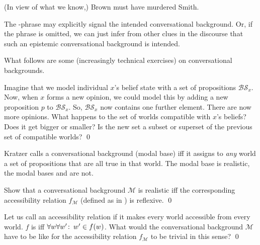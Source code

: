 \ex (In view of what we know,) Brown must have murdered Smith. \xe

The -phrase may explicitly signal the intended
conversational background. Or, if the phrase is omitted, we can just infer from
other clues in the discourse that such an epistemic conversational background is
intended. 

What follows are some (increasingly technical exercises) on conversational
backgrounds.

\begin{exercise}
  Imagine that we model individual $x$'s belief state with a set of
  propositions $\mathcal{BS}_{x}$. Now, when $x$ forms a new opinion, we could model
  this by adding a new proposition $p$ to $\mathcal{BS}_x$. So,
  $\mathcal{BS}_x$ now contains one further element. There are now more
  opinions. What happens to the set of worlds compatible with $x$'s beliefs?
  Does it get bigger or smaller? Is the new set a subset or superset of the
  previous set of compatible worlds? \qed
\end{exercise}

\begin{exercise}
  Kratzer calls a conversational background (modal base)  iff it
  assigns to \emph{any} world a set of propositions that are all true in that
  world. The modal base  is realistic, the modal bases
   and  are not.

  Show that a conversational background $\mathcal{M}$ is realistic iff the
  corresponding accessibility relation $f_{\mathcal{M}}$ (defined as in
  ) is reflexive. \qed
\end{exercise}

\begin{exercise}
	
	Let us call an accessibility relation  if it makes
  every world accessible from every world. $f$ is  iff
  $\forall w\forall w'\co w'\in f(w)$. What would the conversational
  background $\mathcal{M}$ have to be like for the accessibility relation
  $f_{\mathcal{M}}$ to be trivial in this sense? \qed
\end{exercise}

